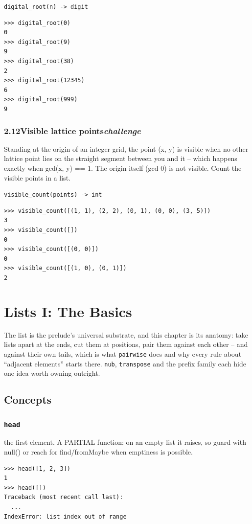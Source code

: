 \documentclass[10pt,letterpaper]{book}
\begin{document}
\noindent\texttt{digital\_root(n) -> digit}
\begin{lstlisting}[style=ex]
>>> digital_root(0)
0
>>> digital_root(9)
9
>>> digital_root(38)
2
>>> digital_root(12345)
6
>>> digital_root(999)
9
\end{lstlisting}
\subsection*{2.12\quad Visible lattice points\hfill\textnormal{\textit{challenge}}}
Standing at the origin of an integer grid, the point (x, y) is visible when no other lattice point lies on the straight segment between you and it -- which happens exactly when gcd(x, y) == 1. The origin itself (gcd 0) is not visible. Count the visible points in a list.

\noindent\texttt{visible\_count(points) -> int}
\begin{lstlisting}[style=ex]
>>> visible_count([(1, 1), (2, 2), (0, 1), (0, 0), (3, 5)])
3
>>> visible_count([])
0
>>> visible_count([(0, 0)])
0
>>> visible_count([(1, 0), (0, 1)])
2
\end{lstlisting}
\clearpage
\chapter{Lists I: The Basics}

The list is the prelude's universal substrate, and this chapter is its
anatomy: take lists apart at the ends, cut them at positions, pair them
against each other -- and against their own tails, which is what
\texttt{pairwise} does and why every rule about ``adjacent elements'' starts
there. \texttt{nub}, \texttt{transpose} and the prefix family each hide one
idea worth owning outright.
\section{Concepts}
\subsection{\texttt{head}}\label{def:head}
the first element. A PARTIAL function: on an empty list it raises, so guard with null() or reach for find/fromMaybe when emptiness is possible.
\begin{lstlisting}[style=ex]
>>> head([1, 2, 3])
1
>>> head([])
Traceback (most recent call last):
  ...
IndexError: list index out of range
\end{lstlisting}
\end{document}
